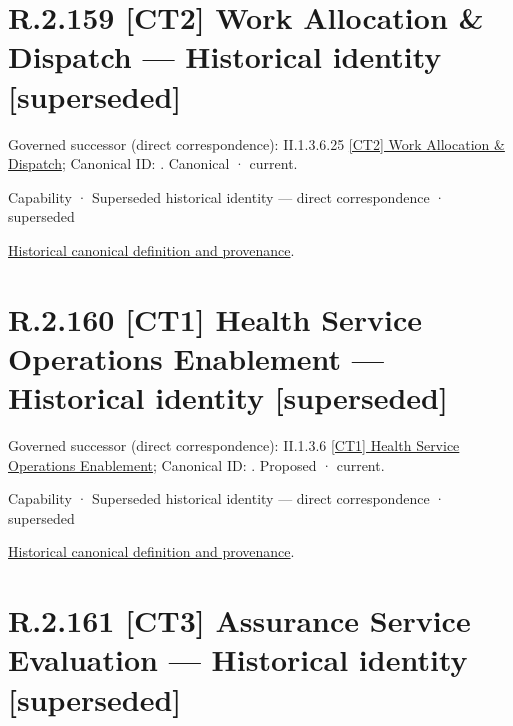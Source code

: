 \section*{R.2.159 [CT2] Work Allocation \& Dispatch — Historical identity [superseded]}
\label{navigation:R.2.159}

{\small Governed successor (direct correspondence): II.1.3.6.25 \hyperref[element:152a5252952c405994e9b171234efcb0]{[CT2] Work Allocation \& Dispatch}; Canonical ID: \texttt{}. Canonical · current.}\par
\label{element:f8c13b6f74b840cc96fbeada5865455a}
{\small Capability · Superseded historical identity — direct correspondence · superseded}\par
\href{../../../../../../../continuum/strategy/capability/f8c13b6f74b840cc96fbeada5865455a.md}{Historical canonical definition and provenance}.\par
\section*{R.2.160 [CT1] Health Service Operations Enablement — Historical identity [superseded]}
\label{navigation:R.2.160}

{\small Governed successor (direct correspondence): II.1.3.6 \hyperref[element:b13ee2c5a4ef4fd6be8a44795696dfc2]{[CT1] Health Service Operations Enablement}; Canonical ID: \texttt{}. Proposed · current.}\par
\label{element:a98424298dac46d8b2ddd109d928270a}
{\small Capability · Superseded historical identity — direct correspondence · superseded}\par
\href{../../../../../../../continuum/strategy/capability/a98424298dac46d8b2ddd109d928270a.md}{Historical canonical definition and provenance}.\par
\section*{R.2.161 [CT3] Assurance Service Evaluation — Historical identity [superseded]}
\label{navigation:R.2.161}

